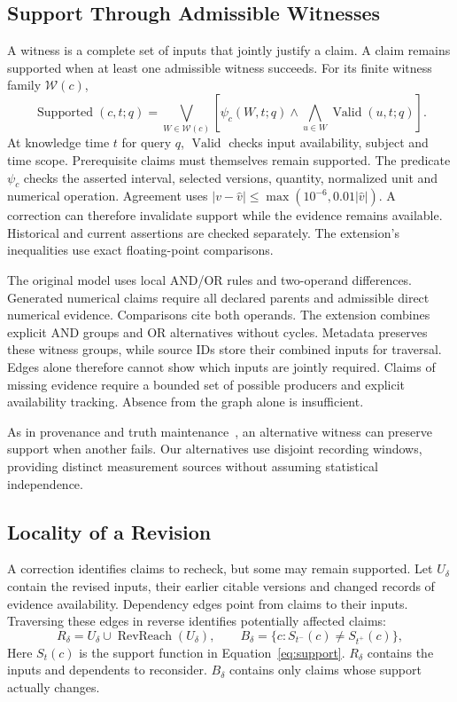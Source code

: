 \documentclass[runningheads]{llncs}
\begin{document}
\subsection{Support Through Admissible Witnesses}

A witness is a complete set of inputs that jointly justify a claim.
A claim remains supported when at least one admissible witness succeeds.
For its finite witness family $\mathcal W(c)$,
\begin{equation}
 \operatorname{Supported}(c,t;q)=
 \bigvee_{W\in\mathcal W(c)}
 \left[\psi_c(W,t;q)\land
       \bigwedge_{u\in W}\operatorname{Valid}(u,t;q)\right].
\label{eq:support}
\end{equation}
At knowledge time $t$ for query $q$, $\operatorname{Valid}$ checks input
availability, subject and time scope. Prerequisite claims must themselves
remain supported. The predicate $\psi_c$ checks the asserted interval,
selected versions, quantity, normalized unit and numerical operation.
Agreement uses $|v-\widehat v|\leq\max(10^{-6},0.01|\widehat v|)$.
A correction can therefore invalidate support while the evidence remains
available. Historical and current assertions are checked separately.
The extension's inequalities use exact floating-point comparisons.

The original model uses local AND/OR rules and two-operand differences.
Generated numerical claims require all declared parents and admissible
direct numerical evidence. Comparisons cite both operands.
The extension combines explicit AND groups and OR alternatives without
cycles. Metadata preserves these witness groups, while source IDs store
their combined inputs for traversal. Edges alone therefore cannot show
which inputs are jointly required. Claims of missing evidence require
a bounded set of possible producers and explicit availability tracking.
Absence from the graph alone is insufficient.

As in provenance and truth maintenance~\cite{green2007,doyle1979},
an alternative witness can preserve support when another fails.
Our alternatives use disjoint recording windows, providing distinct
measurement sources without assuming statistical independence.



\subsection{Locality of a Revision}

A correction identifies claims to recheck, but some may remain supported.
Let $U_\delta$ contain the revised inputs, their earlier citable versions and
changed records of evidence availability. Dependency edges point from claims
to their inputs. Traversing these edges in reverse identifies potentially
affected claims:
\begin{equation}
 R_\delta=U_\delta\cup\operatorname{RevReach}(U_\delta),\qquad
 B_\delta=\{c:S_{t^-}(c)\ne S_{t^+}(c)\},
 \label{eq:locality}
\end{equation}
Here $S_t(c)$ is the support function in Equation~\ref{eq:support}.
$R_\delta$ contains the inputs and dependents to reconsider.
$B_\delta$ contains only claims whose support actually changes.
\end{document}
